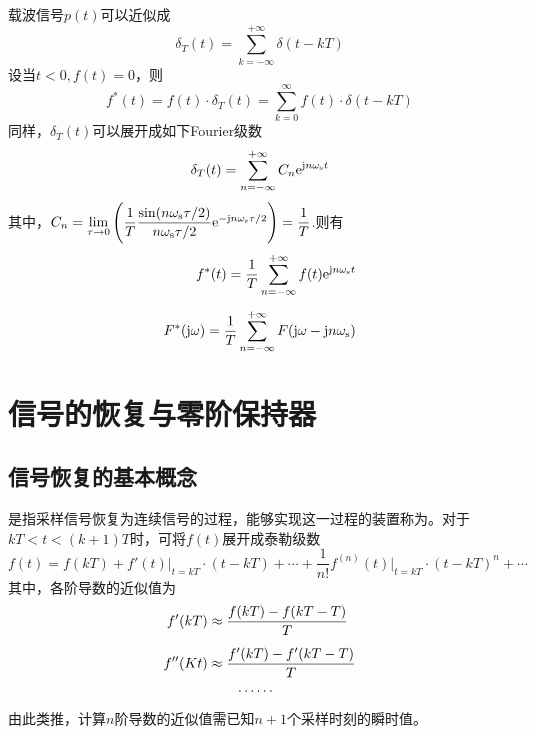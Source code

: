 载波信号$p(t)$可以近似成
\begin{equation}
	\delta_T(t) = \sum_{k = -\infty}^{+\infty}\delta(t - kT)
\end{equation}
设当$t<0,f(t) = 0$，则
\begin{equation}
	f^*(t) = f(t) \cdot \delta_T(t) = \sum_{k = 0}^{\infty} f(t) \cdot \delta(t - kT)
\end{equation}
同样，$\delta_T(t)$可以展开成如下Fourier级数
\begin{equation}
	\delta_T (t) = \sum_{n = -\infty}^{+\infty}C_n {\rm{e}}^{\text{j} n \omega_{\text{s}}t}
\end{equation}
其中，$C_n = \lim\limits_{\tau \to 0} \Bigg(\dfrac{1}{T}\dfrac{\sin(n\omega_\text{s}\tau /2)}{n \omega_\text{s}\tau/2}{\rm{e}}^{- \text{j} n \omega_\text{s}\tau / 2}\Bigg) = \dfrac{1}{T}$.则有
\begin{align}
	f^*(t) = \dfrac{1}{T}\sum_{n = -\infty}^{+\infty}f(t){\rm{e}}^{\text{j} n \omega_\text{s}t}\\[0.5em]
	F^*(\text{j} \omega) = \dfrac{1}{T}\sum_{n = -\infty}^{+\infty}F(\text{j} \omega - \text{j} n \omega_\text{s})
	\label{采样函数}
\end{align}

\section{信号的恢复与零阶保持器}
\subsection{信号恢复的基本概念}
是指采样信号恢复为连续信号的过程，能够实现这一过程的装置称为。对于$kT<t<(k+1)T$时，可将$f(t)$展开成泰勒级数
\begin{equation}
	f(t) = f(kT) + f'(t)\big|_{t = kT}\cdot(t - kT) + \cdots + \dfrac{1}{n!}f^{(n)}(t)\big|_{t = kT} \cdot (t-kT)^n + \cdots
\end{equation}
其中，各阶导数的近似值为
\begin{align}
	f'(kT) &\approx \dfrac{f(kT) - f(kT - T)}{T}\\[0.5em]
	f''(Kt) & \approx \dfrac{f'(kT) - f'(kT - T)}{T}\\
	& \quad \quad \cdots \cdots \notag
\end{align}
由此类推，计算$n$阶导数的近似值需已知$n+1$个采样时刻的瞬时值。

